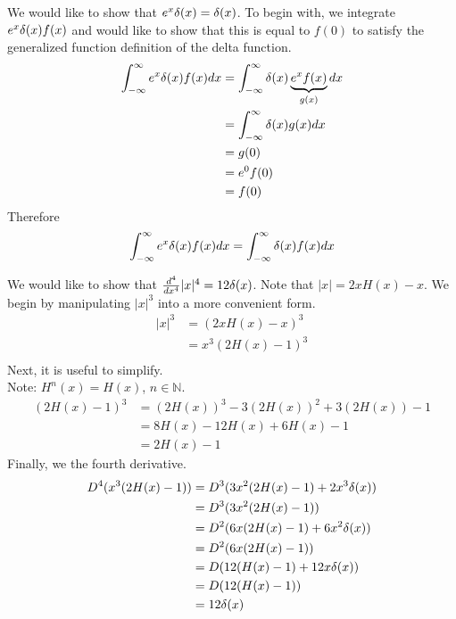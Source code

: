 \begin{example}
    We would like to show that \(e^x\delta(x)=\delta(x)\). To begin with, we integrate \(e^x\delta(x)f(x)\) and would like to show that this is equal to \(f(0)\) to satisfy the generalized function definition of the delta function.
    \begin{equation}
        \begin{split}
            \int_{-\infty}^{\infty} e^x\delta(x)f(x)dx &= \int_{-\infty}^{\infty} \delta(x)\underbrace{e^xf(x)}_{g(x)}dx\\
            &=\int_{-\infty}^{\infty} \delta(x)g(x)dx\\
            &=g(0)\\
            &=e^0f(0)\\
            &=f(0)\\
        \end{split}
    \end{equation}
    Therefore
    \begin{equation}
        \int_{-\infty}^{\infty} e^x\delta(x)f(x)dx = \int_{-\infty}^{\infty} \delta(x)f(x)dx
    \end{equation}
\end{example}
\begin{example}
    We would like to show that \(\frac{d^4}{dx^4}|x|^4 = 12\delta(x)\). Note that \(|x|=2xH(x)-x\). We begin by manipulating \(|x|^3\) into a more convenient form.
    \begin{equation}
        \begin{split}
            |x|^3 &= (2xH(x)-x)^3\\
            &=x^3(2H(x)-1)^3\\
        \end{split}
    \end{equation}
    Next, it is useful to simplify.\\
    Note: \(H^n(x)=H(x)\), \(n\in\mathbb{N}\).
    \begin{equation}
        \begin{split}
            (2H(x)-1)^3 &= (2H(x))^3-3(2H(x))^2+3(2H(x))-1\\
            &=8H(x)-12H(x)+6H(x)-1\\
            &=2H(x)-1
        \end{split}
    \end{equation}
    Finally, we the fourth derivative.
    \begin{equation}
        \begin{split}
            D^4(x^3(2H(x)-1)) &= D^3(3x^2(2H(x)-1) +2x^3\delta(x))\\
            &=D^3(3x^2(2H(x)-1))\\
            &= D^2(6x(2H(x)-1) + 6x^2\delta(x))\\
            &=D^2(6x(2H(x)-1))\\
            &= D(12(H(x)-1) + 12x\delta(x))\\
            &= D(12(H(x)-1))\\
            &= 12\delta(x)
        \end{split}
    \end{equation}
\end{example}